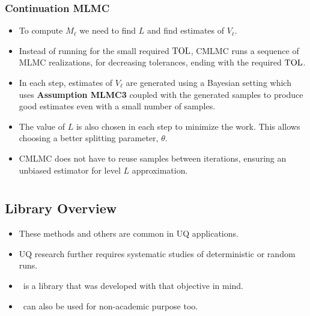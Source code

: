 
\begin{frame}\frametitle{Continuation MLMC}
\begin{itemize}
\item To compute $M_\ell$ we need to find $L$ and find estimates of
  $V_\ell$.
\pause
    \item Instead of running for the small required $\mathrm{TOL}$, CMLMC runs
      a sequence of MLMC realizations, for decreasing
      tolerances, ending with the required $\mathrm{TOL}$.
    \item In each step, estimates of $V_\ell$ are generated using a
      Bayesian setting which uses {\bf Assumption MLMC3} coupled with
      the generated samples to produce good estimates even with a
      small number of samples.
    \item The value of $L$ is also chosen in each step to minimize the
      work. This allows choosing a better splitting parameter,
      $\theta$.
    \item CMLMC does not have to reuse samples between iterations,
      ensuring an unbiased estimator for level $L$ approximation.
  \end{itemize}
\end{frame}



\section{\lib}
\subsection{Library Overview}
\begin{frame}
  \begin{itemize}
  \item These methods and others are common in UQ applications.
  \item UQ research further requires \alert{systematic} studies of
    deterministic or random runs.
  \item \lib~is a library that was developed with that
    objective in mind.
  \item \lib~can also be used for non-academic purpose too.
  \end{itemize}
\end{frame}

